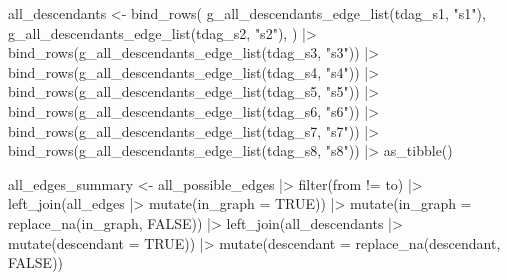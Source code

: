 \documentclass[
  letterpaper,
  DIV=11,
  numbers=noendperiod]{scrartcl}
\newenvironment{Shaded}{\begin{snugshade}}{\end{snugshade}}
\newcommand{\AttributeTok}[1]{\textcolor[rgb]{0.40,0.45,0.13}{#1}}
\newcommand{\ConstantTok}[1]{\textcolor[rgb]{0.56,0.35,0.01}{#1}}
\newcommand{\FunctionTok}[1]{\textcolor[rgb]{0.28,0.35,0.67}{#1}}
\newcommand{\NormalTok}[1]{\textcolor[rgb]{0.00,0.23,0.31}{#1}}
\newcommand{\OtherTok}[1]{\textcolor[rgb]{0.00,0.23,0.31}{#1}}
\newcommand{\SpecialCharTok}[1]{\textcolor[rgb]{0.37,0.37,0.37}{#1}}
\newcommand{\StringTok}[1]{\textcolor[rgb]{0.13,0.47,0.30}{#1}}
\begin{document}
\begin{Shaded}
\begin{Highlighting}[]
\NormalTok{all\_descendants }\OtherTok{\textless{}{-}} 
    \FunctionTok{bind\_rows}\NormalTok{(}
        \FunctionTok{g\_all\_descendants\_edge\_list}\NormalTok{(tdag\_s1, }\StringTok{"s1"}\NormalTok{),}
        \FunctionTok{g\_all\_descendants\_edge\_list}\NormalTok{(tdag\_s2, }\StringTok{"s2"}\NormalTok{),}
\NormalTok{    ) }\SpecialCharTok{|\textgreater{}} 
    \FunctionTok{bind\_rows}\NormalTok{(}\FunctionTok{g\_all\_descendants\_edge\_list}\NormalTok{(tdag\_s3, }\StringTok{"s3"}\NormalTok{)) }\SpecialCharTok{|\textgreater{}} 
    \FunctionTok{bind\_rows}\NormalTok{(}\FunctionTok{g\_all\_descendants\_edge\_list}\NormalTok{(tdag\_s4, }\StringTok{"s4"}\NormalTok{)) }\SpecialCharTok{|\textgreater{}} 
    \FunctionTok{bind\_rows}\NormalTok{(}\FunctionTok{g\_all\_descendants\_edge\_list}\NormalTok{(tdag\_s5, }\StringTok{"s5"}\NormalTok{)) }\SpecialCharTok{|\textgreater{}} 
    \FunctionTok{bind\_rows}\NormalTok{(}\FunctionTok{g\_all\_descendants\_edge\_list}\NormalTok{(tdag\_s6, }\StringTok{"s6"}\NormalTok{)) }\SpecialCharTok{|\textgreater{}} 
    \FunctionTok{bind\_rows}\NormalTok{(}\FunctionTok{g\_all\_descendants\_edge\_list}\NormalTok{(tdag\_s7, }\StringTok{"s7"}\NormalTok{)) }\SpecialCharTok{|\textgreater{}} 
    \FunctionTok{bind\_rows}\NormalTok{(}\FunctionTok{g\_all\_descendants\_edge\_list}\NormalTok{(tdag\_s8, }\StringTok{"s8"}\NormalTok{)) }\SpecialCharTok{|\textgreater{}} 
    \FunctionTok{as\_tibble}\NormalTok{()}


\NormalTok{all\_edges\_summary }\OtherTok{\textless{}{-}} 
\NormalTok{    all\_possible\_edges }\SpecialCharTok{|\textgreater{}} 
    \FunctionTok{filter}\NormalTok{(from }\SpecialCharTok{!=}\NormalTok{ to) }\SpecialCharTok{|\textgreater{}} 
    \FunctionTok{left\_join}\NormalTok{(all\_edges }\SpecialCharTok{|\textgreater{}} \FunctionTok{mutate}\NormalTok{(}\AttributeTok{in\_graph =} \ConstantTok{TRUE}\NormalTok{)) }\SpecialCharTok{|\textgreater{}} 
    \FunctionTok{mutate}\NormalTok{(}\AttributeTok{in\_graph =} \FunctionTok{replace\_na}\NormalTok{(in\_graph, }\ConstantTok{FALSE}\NormalTok{)) }\SpecialCharTok{|\textgreater{}} 
    \FunctionTok{left\_join}\NormalTok{(all\_descendants }\SpecialCharTok{|\textgreater{}} \FunctionTok{mutate}\NormalTok{(}\AttributeTok{descendant =} \ConstantTok{TRUE}\NormalTok{)) }\SpecialCharTok{|\textgreater{}} 
    \FunctionTok{mutate}\NormalTok{(}\AttributeTok{descendant =} \FunctionTok{replace\_na}\NormalTok{(descendant, }\ConstantTok{FALSE}\NormalTok{))}
\end{Highlighting}
\end{Shaded}
\end{document}
